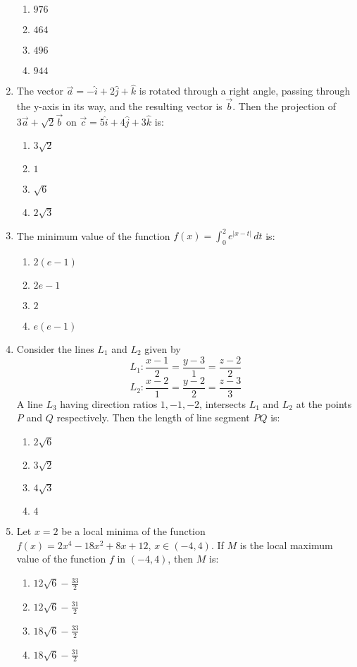 \documentclass[journal,12pt,onecolumn]{IEEEtran}
\theoremstyle{remark}
\begin{document}
\begin{enumerate}
\begin{enumerate}
    \item $976$
    \item $464$
    \item $496$
    \item $944$
\end{enumerate}
\item The vector $\vec{a} = -\hat{i} + 2\hat{j} + \hat{k}$ is rotated through a right angle, passing through the y-axis in its way, and the resulting vector is $\vec{b}$. Then the projection of $3\vec{a} + \sqrt{2}\vec{b}$ on $\vec{c} = 5\hat{i} + 4\hat{j} + 3\hat{k}$ is:
\begin{enumerate}
    \item $3\sqrt{2}$
    \item $1$
    \item $\sqrt{6}$
    \item $2\sqrt{3}$
\end{enumerate}
\item The minimum value of the function 
$f(x) = \int_0^2 e^{|x-t|} \, dt$
is:
\begin{enumerate}
    \item $2(e - 1)$
    \item $2e - 1$
    \item $2$
    \item $e(e - 1)$
\end{enumerate}

\item Consider the lines $L_1$ and $L_2$ given by
\[
L_1: \frac{x-1}{2} = \frac{y-3}{1} = \frac{z-2}{2}
\]
\[
L_2: \frac{x-2}{1} = \frac{y-2}{2} = \frac{z-3}{3}
\]
A line $L_3$ having direction ratios $1, -1, -2$, intersects $L_1$ and $L_2$ at the points $P$ and $Q$ respectively. Then the length of line segment $PQ$ is:
\begin{enumerate}
    \item $2\sqrt{6}$
    \item $3\sqrt{2}$
    \item $4\sqrt{3}$
    \item $4$
\end{enumerate}

\item Let $x = 2$ be a local minima of the function 
$f(x) = 2x^4 - 18x^2 + 8x + 12, \, x \in (-4, 4)$. 
If $M$ is the local maximum value of the function $f$ in $(-4, 4)$, then $M$ is:
\begin{enumerate}
    \item $12\sqrt{6} - \frac{33}{2}$
    \item $12\sqrt{6} - \frac{31}{2}$
    \item $18\sqrt{6} - \frac{33}{2}$
    \item $18\sqrt{6} - \frac{31}{2}$
\end{enumerate}


\end{enumerate}
\end{document}
